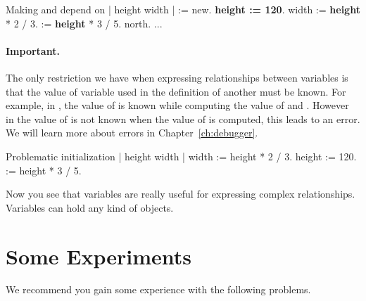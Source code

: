 \begin{scriptwithtitle}{Making  and \ct{\dist} \newcommand{\replace}[2]{depending}{depend} on }\label{src:a100varwl}
| \caro height width \dist|
\caro := \Turtle new.
\textbf{height := 120}.
width := \textbf{height} * 2 / 3.
\dist := \textbf{height} * 3 / 5.
\caro north.
...
\end{scriptwithtitle}


\paragraph{Important.} The only \newcommand{\replace}[2]{constraint}{restriction} we have \newcommand{\replace}[2]{while}{when} expressing relationships between variables is that the value of \newcommand{\add}[1]{each} variable used in the definition of
another \newcommand{\replace}[2]{should}{must} be known. For example, in ,
the value of  is known while computing the value of
 and \ct{\dist}.  \newcommand{\replace}[2]{On the contrary,}{However} in  the value of  is not known when the value of  is computed, \newcommand{\add}[1]{and} this leads to an error. We will \newcommand{\replace}[2]{elaborate}{learn} more \newcommand{\replace}[2]{on}{about} errors in Chapter~\ref{ch:debugger}.

\begin{scriptwithtitle}{Problematic  initialization}\label{src:wrong}
| height width \dist |
width := height * 2 / 3.
height := 120.
\dist := height * 3 / 5.
\end{scriptwithtitle}

Now you see that variables are really useful \newcommand{\replace}[2]{to expression}{for expressing} complex relationships\newcommand{\replace}[2]{ and}{. Variables} can hold any kind of objects.

\section{Some \newcommand{\replace}[2]{Experimentations}{Experiments}}
We recommend you gain some experience with the following problems.

